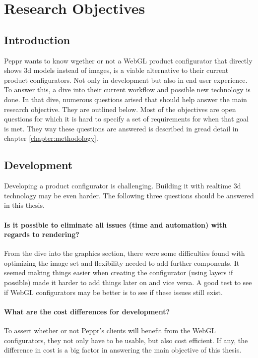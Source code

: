 \chapter{Research Objectives}
\section{Introduction}
Peppr wants to know wgether or not a WebGL product configurator that directly shows 3d models instead of images, is a viable alternative to their current product configurators. Not only in development but also in end user experience. To answer this, a dive into their current workflow and possible new technology is done. In that dive, numerous questions arised that should help answer the main research objective. They are outlined below. Most of the objectives are open questions for which it is hard to specify a set of requirements for when that goal is met. They way these questions are answered is described in gread detail in chapter \ref{chapter:methodology}.
\section{Development}
Developing a product configurator is challenging. Building it with realtime 3d technology may be even harder. The following three questions should be answered in this thesis.
\subsubsection {Is it possible to eliminate all issues (time and automation) with regards to rendering?}
From the dive into the graphics section, there were some difficulties found with optimizing the image set and flexibility needed to add further components. It seemed making things easier when creating the configurator (using layers if possible) made it harder to add things later on and vice versa. A good test to see if WebGL configurators may be better is to see if these issues still exist.

\subsubsection{What are the cost differences for development?}
To assert whether or not Peppr's clients will benefit from the WebGL configurators, they not only have to be usable, but also cost efficient. If any, the difference in cost is a big factor in answering the main objective of this thesis.

